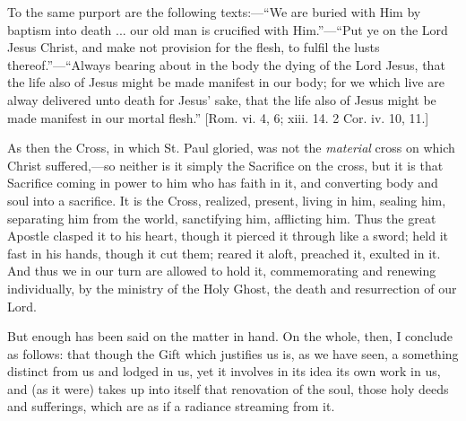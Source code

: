 To the same purport are the following texts:—``We are buried
with Him by baptism into death ... our old man is crucified with
Him.''—``Put ye on the Lord Jesus Christ, and make not
provision for the flesh, to fulfil the lusts thereof.''—``Always
bearing about in the body the dying of the Lord Jesus, that the life
also of Jesus might be made manifest in our body; for we which live
are alway delivered unto death for Jesus' sake, that the life also of
Jesus might be made manifest in our mortal flesh.'' [Rom. vi. 4,
6; xiii. 14. 2 Cor. iv. 10, 11.]

As then the Cross, in which St. Paul gloried, was not the \emph{material}
cross on which Christ suffered,—so neither is it simply the
Sacrifice on the cross, but it is that Sacrifice coming in power to
him who has faith in it, and converting body and soul into a
sacrifice. It is the Cross, realized, present, living in him, sealing
him, separating him from the world, sanctifying him, afflicting him.
Thus the great Apostle clasped it to his heart, though it pierced it
through like a sword; held it fast in his hands, though it cut them;
reared it aloft, preached it, exulted in it. And thus we in our turn
are allowed to hold it, commemorating and renewing individually, by
the ministry of the Holy Ghost, the death and resurrection of our
Lord.

But enough has been said on the matter in hand. On the whole, then,
I conclude as follows: that though the Gift which justifies us is, as
we have seen, a something distinct from us and lodged in us, yet it
involves in its idea its own work in us, and (as it were) takes up
into itself that renovation of the soul, those holy deeds and
sufferings, which are as if a radiance streaming from it.


